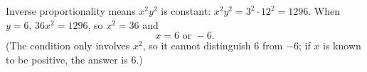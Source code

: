 Inverse proportionality means $x^2y^2$ is constant: $x^2y^2=3^2\cdot12^2=1296$. When $y=6$, $36x^2=1296$, so $x^2=36$ and
\[
x=\boxed{6\text{ or }-6}.
\]
(The condition only involves $x^2$, so it cannot distinguish $6$ from $-6$; if $x$ is known to be positive, the answer is $6$.)
